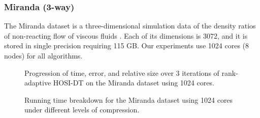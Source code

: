     \subsubsection{Miranda (3-way)}\label{sec:high_nr}
        The Miranda dataset is a three-dimensional simulation data of the
        density ratios of non-reacting flow of viscous fluids \cite{KD+20}. Each
        of its dimensions is 3072, and it is stored in single
        precision requiring 115 GB.
        Our experiments use 1024 cores (8 nodes) for all algorithms.

        \begin{figure}
            \centering
            \renewcommand{\datapath}{data/Miranda/N8_n1024}
            \renewcommand{\thresh}{1e-01,5e-02,1e-02}
            
            \caption{Progression of time, error, and relative size over 3 iterations of rank-adaptive HOSI-DT on the Miranda dataset using 1024 cores.}
            \label{fig:miranda}
        \end{figure}

        \begin{figure}
            \centering
            \renewcommand{\datapath}{data/Miranda/N8_n1024}
            \renewcommand{\thresh}{1e-01,5e-02,1e-02}
            
            \caption{Running time breakdown for the Miranda dataset using 1024 cores under different levels of compression.}
            \label{fig:miranda_breakdown}
        \end{figure}

